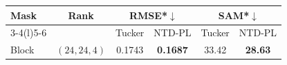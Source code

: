 \begin{tabular}{@{}l c cc cc@{}}
\toprule
Mask & Rank & \multicolumn{2}{c}{RMSE*$\downarrow$} & \multicolumn{2}{c}{SAM*$\downarrow$} \\
\cmidrule(lr){3-4}\cmidrule(l){5-6}
 & & Tucker & NTD-PL & Tucker & NTD-PL \\
\midrule
Block & $(24,24,4)$ & 0.1743 & \textbf{0.1687} & 33.42 & \textbf{28.63} \\
\bottomrule
\end{tabular}
